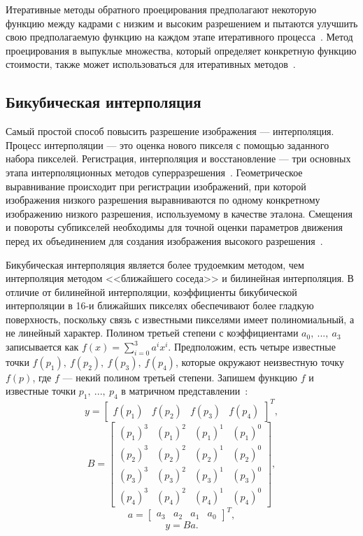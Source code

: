 \documentclass{bmstu}
\begin{document}
Итеративные методы обратного проецирования предполагают некоторую функцию между кадрами с низким и высоким разрешением и пытаются улучшить свою предполагаемую функцию на каждом этапе итеративного процесса~\cite{Cohen2000}. 
Метод проецирования в выпуклые множества, который определяет конкретную функцию стоимости, также может использоваться для итеративных методов~\cite{Katsaggelos1997}.

\subsection{Бикубическая интерполяция}

Самый простой способ повысить разрешение изображения --- интерполяция. 
Процесс интерполяции --- это оценка нового пикселя с помощью заданного набора пикселей. 
Регистрация, интерполяция и восстановление --- три основных этапа интерполяционных методов суперразрешения~\cite{Thapa2016}. 
Геометрическое выравнивание происходит при регистрации изображений, при которой изображения низкого разрешения выравниваются по одному конкретному изображению низкого разрешения, используемому в качестве эталона. 
Смещения и повороты субпикселей необходимы для точной оценки параметров движения перед их объединением для создания изображения высокого разрешения~\cite{Daithankar2021}.

Бикубическая интерполяция является более трудоемким методом, чем интерполяция методом <<ближайшего соседа>> и билинейная интерполяция. 
В отличие от билинейной интерполяции, коэффициенты бикубической интерполяции в 16-и ближайших пикселях обеспечивают более гладкую поверхность, поскольку связь с известными пикселями имеет полиномиальный, а не линейный характер. 
Полином третьей степени с коэффициентами $a_0,~...,~a_3$ записывается как $f(x) = \sum_{i = 0}^{3} a^ix^i$. 
Предположим, есть четыре известные точки $f(p_1),~f(p_2),~f(p_3),~f(p_4)$, которые окружают неизвестную точку $f(p)$, где $f$ --- некий полином третьей степени. 
Запишем функцию $f$ и известные точки $p_1,~...,~p_4$ в матричном представлении~\cite{Bavenstrand2021}:
\begin{equation}
y = \begin{bmatrix}
f(p_1) & f(p_2) & f(p_3) & f(p_4)
\end{bmatrix}^{T},
\end{equation}
\begin{equation}
B = \begin{bmatrix}
    (p_1)^3 & (p_1)^2 & (p_1)^1 & (p_1)^0 \\
    (p_2)^3 & (p_2)^2 & (p_2)^1 & (p_2)^0 \\
    (p_3)^3 & (p_3)^2 & (p_3)^1 & (p_3)^0 \\
    (p_4)^3 & (p_4)^2 & (p_4)^1 & (p_4)^0
\end{bmatrix},
\end{equation}
\begin{equation}
a = \begin{bmatrix}
a_3 & a_2 & a_1 & a_0
\end{bmatrix}^{T},
\end{equation}
\begin{equation}
y = Ba.
\end{equation}
\end{document}
